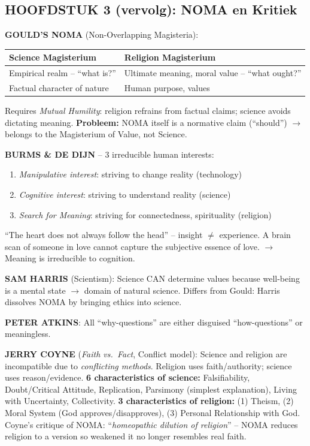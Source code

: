 \documentclass[a4paper,10pt]{article}
\begin{document}
\vspace{3pt}

\subsection{HOOFDSTUK 3 (vervolg): NOMA en Kritiek}

\textbf{GOULD'S NOMA} (Non-Overlapping Magisteria):

\begin{tabular}{ll}
\toprule
Science Magisterium & Religion Magisterium \\
\midrule
Empirical realm -- ``what is?'' & Ultimate meaning, moral value -- ``what ought?'' \\
Factual character of nature & Human purpose, values \\
\bottomrule
\end{tabular}

Requires \textit{Mutual Humility}: religion refrains from factual claims; science avoids dictating meaning. \textbf{Probleem:} NOMA itself is a normative claim (``should'') $\to$ belongs to the Magisterium of Value, not Science.

\textbf{BURMS \& DE DIJN} -- 3 irreducible human interests:
\begin{enumerate}[noitemsep]
  \item \textit{Manipulative interest}: striving to change reality (technology)
  \item \textit{Cognitive interest}: striving to understand reality (science)
  \item \textit{Search for Meaning}: striving for connectedness, spirituality (religion)
\end{enumerate}
``The heart does not always follow the head'' -- insight $\ne$ experience. A brain scan of someone in love cannot capture the subjective essence of love. $\to$ Meaning is irreducible to cognition.

\textbf{SAM HARRIS} (Scientism): Science CAN determine values because well-being is a mental state $\to$ domain of natural science. Differs from Gould: Harris dissolves NOMA by bringing ethics into science.

\textbf{PETER ATKINS}: All ``why-questions'' are either disguised ``how-questions'' or meaningless.

\textbf{JERRY COYNE} (\textit{Faith vs.\ Fact}, Conflict model): Science and religion are incompatible due to \textit{conflicting methods}. Religion uses faith/authority; science uses reason/evidence. \textbf{6 characteristics of science:} Falsifiability, Doubt/Critical Attitude, Replication, Parsimony (simplest explanation), Living with Uncertainty, Collectivity. \textbf{3 characteristics of religion:} (1) Theism, (2) Moral System (God approves/disapproves), (3) Personal Relationship with God. Coyne's critique of NOMA: ``\textit{homeopathic dilution of religion}'' -- NOMA reduces religion to a version so weakened it no longer resembles real faith.
\end{document}
